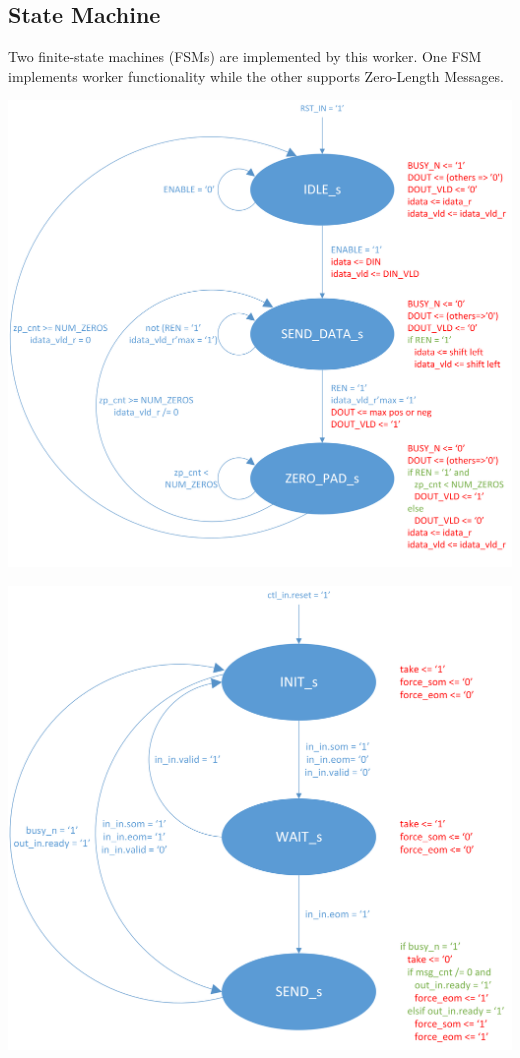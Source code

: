 \documentclass{article}
\begin{document}
\subsection*{State Machine}
\begin{flushleft}
	Two finite-state machines (FSMs) are implemented by this worker. One FSM implements worker functionality while the other supports Zero-Length Messages.
\end{flushleft}
{\centering\captionsetup{type=figure}\includegraphics[scale=0.6]{zero_padding_fsm}\par{}\label{fig:zp_fsm}} \hfill \break
{\centering\captionsetup{type=figure}\includegraphics[scale=0.7]{zlm_fsm}\par{}\label{fig:zlm_fsm}}
\end{document}
